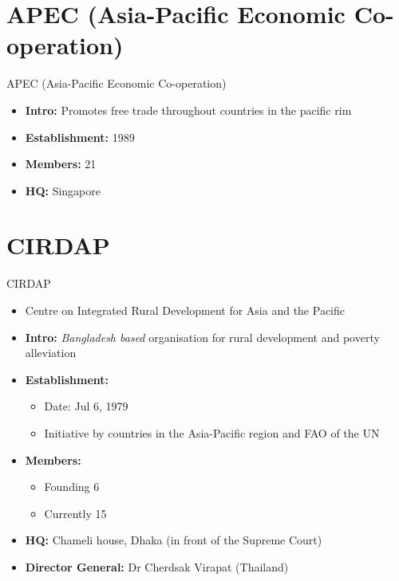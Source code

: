 \documentclass[
  12pt,
  ignorenonframetext,
  progressbar=frametitle]{beamer}
\providecommand{\tightlist}{%
  \setlength{\itemsep}{0pt}\setlength{\parskip}{0pt}}
\begin{document}
\section{APEC (Asia-Pacific Economic Co-operation)}
\begin{frame}[allowframebreaks]
{APEC (Asia-Pacific Economic Co-operation)}
\protect\hypertarget{apec-asia-pacific-economic-co-operation}{}
\begin{itemize}
\tightlist
\item
  \textbf{Intro:} Promotes free trade throughout countries in the
  pacific rim
\item
  \textbf{Establishment:} 1989
\item
  \textbf{Members:} 21
\item
  \textbf{HQ:} Singapore
\end{itemize}
\end{frame}

\section{CIRDAP}
\begin{frame}[allowframebreaks]
{CIRDAP}
\protect\hypertarget{cirdap}{}
\begin{itemize}
\tightlist
\item
  Centre on Integrated Rural Development for Asia and the Pacific
\item
  \textbf{Intro:} \emph{Bangladesh based} organisation for rural
  development and poverty alleviation
\item
  \textbf{Establishment:}

  \begin{itemize}
  \tightlist
  \item
    Date: Jul 6, 1979
  \item
    Initiative by countries in the Asia-Pacific region and FAO of the UN
  \end{itemize}
\item
  \textbf{Members:}

  \begin{itemize}
  \tightlist
  \item
    Founding 6
  \item
    Currently 15
  \end{itemize}
\item
  \textbf{HQ:} Chameli house, Dhaka (in front of the Supreme Court)
\item
  \textbf{Director General:} Dr Cherdsak Virapat (Thailand)
\end{itemize}
\end{frame}
\end{document}
